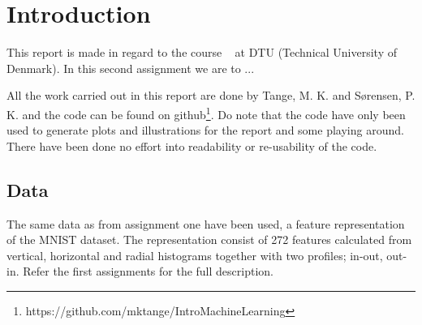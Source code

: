 \chapter{Introduction}
This report is made in regard to the course \textsf{\courseno\ \coursename} at DTU (Technical University of Denmark). In this second assignment we are to ...


All the work carried out in this report are done by Tange, M. K. and Sørensen, P. K. and the code can be found on github\footnote{https://github.com/mktange/IntroMachineLearning}. Do note that the code have only been used to generate plots and illustrations for the report and some playing around. There have been done no effort into readability or re-usability of the code.

\section{Data}
The same data as from assignment one have been used, a feature representation of the MNIST dataset. The representation consist of 272 features calculated from vertical, horizontal and radial histograms together with two profiles; in-out, out-in. Refer the first assignments for the full description. 